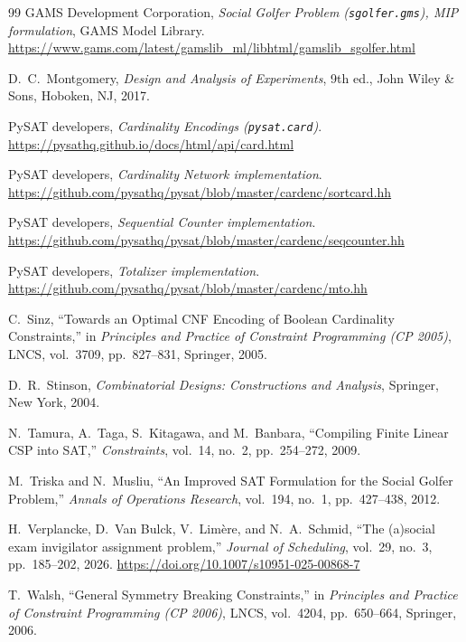 \documentclass[a4paper,fleqn]{cas-sc}
\begin{document}
\begin{thebibliography}{99}
GAMS Development Corporation,
\textit{Social Golfer Problem (\texttt{sgolfer.gms}), MIP formulation},
GAMS Model Library.
\url{https://www.gams.com/latest/gamslib_ml/libhtml/gamslib_sgolfer.html}

D.~C.~Montgomery,
\textit{Design and Analysis of Experiments},
9th ed., John Wiley \& Sons, Hoboken, NJ, 2017.

PySAT developers, \textit{Cardinality Encodings (\texttt{pysat.card})}.
\url{https://pysathq.github.io/docs/html/api/card.html}

PySAT developers, \textit{Cardinality Network implementation}.
\url{https://github.com/pysathq/pysat/blob/master/cardenc/sortcard.hh}

PySAT developers, \textit{Sequential Counter implementation}.
\url{https://github.com/pysathq/pysat/blob/master/cardenc/seqcounter.hh}

PySAT developers, \textit{Totalizer implementation}.
\url{https://github.com/pysathq/pysat/blob/master/cardenc/mto.hh}

C.~Sinz,
``Towards an Optimal CNF Encoding of Boolean Cardinality Constraints,''
in \textit{Principles and Practice of Constraint Programming (CP 2005)},
LNCS, vol.~3709, pp.~827--831, Springer, 2005.

D.~R.~Stinson,
\textit{Combinatorial Designs: Constructions and Analysis},
Springer, New York, 2004.

N.~Tamura, A.~Taga, S.~Kitagawa, and M.~Banbara,
``Compiling Finite Linear CSP into SAT,''
\textit{Constraints}, vol.~14, no.~2, pp.~254--272, 2009.

M.~Triska and N.~Musliu,
``An Improved SAT Formulation for the Social Golfer Problem,''
\textit{Annals of Operations Research}, vol.~194, no.~1, pp.~427--438, 2012.

H.~Verplancke, D.~Van Bulck, V.~Lim\`ere, and N.~A.~Schmid,
``The (a)social exam invigilator assignment problem,''
\textit{Journal of Scheduling}, vol.~29, no.~3, pp.~185--202, 2026.
\url{https://doi.org/10.1007/s10951-025-00868-7}

T.~Walsh,
``General Symmetry Breaking Constraints,''
in \textit{Principles and Practice of Constraint Programming (CP 2006)},
LNCS, vol.~4204, pp.~650--664, Springer, 2006.

\end{thebibliography}
\end{document}
